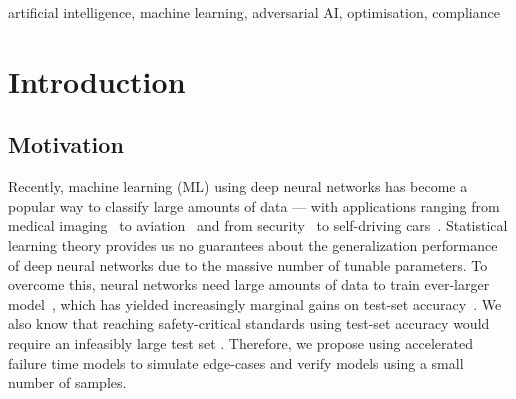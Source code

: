\documentclass[conference]{IEEEtran}
\begin{document}
\begin{IEEEkeywords}
artificial intelligence, machine learning, adversarial AI, optimisation, compliance
\end{IEEEkeywords}


\section{Introduction}
\subsection{Motivation}

Recently, machine learning (ML) using deep neural networks has become a popular way to classify large amounts of data --- with applications ranging from medical imaging~\cite{ai_medical_imaging} to aviation~\cite{ai_aviation} and from security~\cite{ai_security,ai_luggage,ai_prison} to self-driving cars~\cite{ai_automotive}. 
Statistical learning theory \cite{vcdimension} provides us no guarantees about the generalization performance of deep neural networks due to the massive number of tunable parameters. To overcome this, neural networks need large amounts of data\cite{desislavov2021compute,bailly2022effects} to train ever-larger model~\cite{desislavov2021compute}, which has  yielded increasingly marginal gains on test-set accuracy~\cite{sun2017revisiting}. We also know that  reaching safety-critical standards using test-set accuracy would require an infeasibly large test set \cite{meyers}. Therefore, we propose using accelerated failure time models to simulate edge-cases and verify models using a small number of samples.
\end{document}
